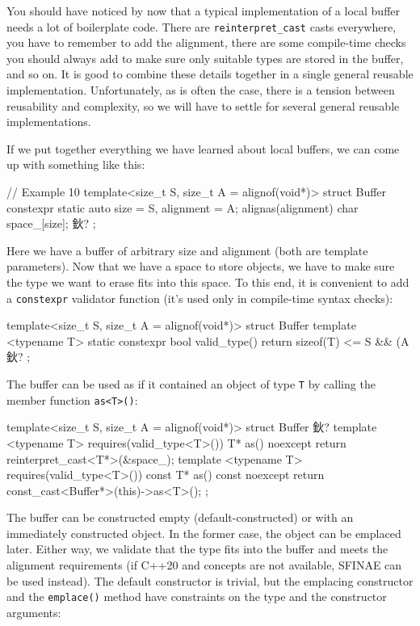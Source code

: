 You should have noticed by now that a typical implementation of a local buffer needs a lot of boilerplate code. There are \texttt{reinterpret\_cast} casts everywhere, you have to remember to add the alignment, there are some compile-time checks you should always add to make sure only suitable types are stored in the buffer, and so on. It is good to combine these details together in a single general reusable implementation. Unfortunately, as is often the case, there is a tension between reusability and complexity, so we will have to settle for several general reusable implementations.

If we put together everything we have learned about local buffers, we can come up with something like this:

\begin{code}
// Example 10
template<size_t S, size_t A = alignof(void*)>
struct Buffer {
  constexpr static auto size = S, alignment = A;
  alignas(alignment) char space_[size];
  鈥?
};
\end{code}

Here we have a buffer of arbitrary size and alignment (both are template parameters). Now that we have a space to store objects, we have to make sure the type we want to erase fits into this space. To this end, it is convenient to add a \texttt{constexpr} validator function (it's used only in compile-time syntax checks):

\begin{code}
template<size_t S, size_t A = alignof(void*)>
struct Buffer {
  template <typename T> static constexpr bool valid_type()
  {
    return sizeof(T) <= S && (A %
  }
  鈥?
};
\end{code}

The buffer can be used as if it contained an object of type \texttt{T} by calling the member function \texttt{as\textless{}T\textgreater{}()}:

\begin{code}
template<size_t S, size_t A = alignof(void*)>
struct Buffer {
  鈥?
  template <typename T> requires(valid_type<T>())
    T* as() noexcept {
    return reinterpret_cast<T*>(&space_);
  }
  template <typename T> requires(valid_type<T>())
    const T* as() const noexcept {
    return const_cast<Buffer*>(this)->as<T>();
  }
};
\end{code}

The buffer can be constructed empty (default-constructed) or with an immediately constructed object. In the former case, the object can be emplaced later. Either way, we validate that the type fits into the buffer and meets the alignment requirements (if C++20 and concepts are not available, SFINAE can be used instead). The default constructor is trivial, but the emplacing constructor and the \texttt{emplace()} method have constraints on the type and the constructor arguments:

